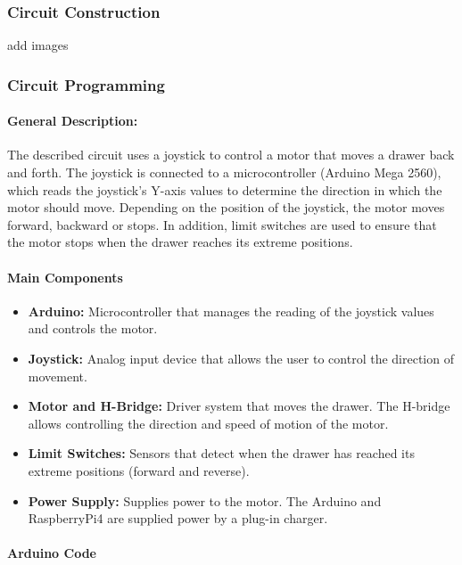     \subsubsection{Circuit Construction}
    add images
    
    \subsubsection{Circuit Programming}
    
    \paragraph{\textbf{General Description:}}
    
    
    The described circuit uses a joystick to control a motor that moves a drawer back and forth. The joystick is connected to a microcontroller (Arduino Mega 2560), which reads the joystick's Y-axis values to determine the direction in which the motor should move. Depending on the position of the joystick, the motor moves forward, backward or stops. In addition, limit switches are used to ensure that the motor stops when the drawer reaches its extreme positions.
    
    
    
    \paragraph{\textbf{Main Components}
    }
    \begin{itemize}
        \item \textbf{Arduino:} Microcontroller that manages the reading of the joystick values and controls the motor.
        \item \textbf{Joystick:} Analog input device that allows the user to control the direction of movement.
        \item \textbf{Motor and H-Bridge:} Driver system that moves the drawer. The H-bridge allows controlling the direction and speed of motion of the motor.
        \item \textbf{Limit Switches:} Sensors that detect when the drawer has reached its extreme positions (forward and reverse).
        \item \textbf{Power Supply:} Supplies power to the motor. The Arduino and RaspberryPi4 are supplied power by a plug-in charger.
    \end{itemize}
    
    
    \paragraph{\textbf{Arduino Code}
    }
    
